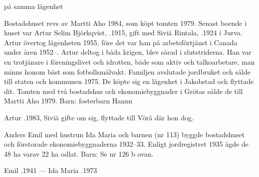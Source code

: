  på samma lägenhet



Bostadshuset revs av Martti Aho 1984, som köpt tomten 1979. Senast boende i huset var Artur Selim Björkqvist, .1915, gift med Siviä Rintala, .1924 i Jurva. Artur övertog lägenheten 1955, före det var han på arbetsförtjänst i Canada under åren 1952--. Artur deltog i båda krigen, blev sårad i slutstriderna.  Han var  en trotjänare i föreningslivet och idrotten, både som aktiv och talkoarbetare, man minns honom bäst som fotbollsmålvakt.  Familjen avslutade jordbruket och sålde till staten och kommunen 1975. De köpte sig en lägenhet i Jakobstad och flyttade dit. Tomten med två bostadshus och ekonomiebyggnader i Grötas sålde de till Martti Aho 1979.
Barn: fosterbarn Hannu

Artur .1983, Siviä gifte om sig, flyttade till Vörå där hon dog.


Anders Emil med hustrun Ida Maria och barnen (nr 113) byggde bostadshuset och förstorade ekonomiebyggnaderna 1932--33. Enligt jordregistret 1935 ägde de 48 ha varav 22 ha odlat.
Barn: Se nr 126 b ovan.

Emil .1941  ---  Ida Maria .1973






